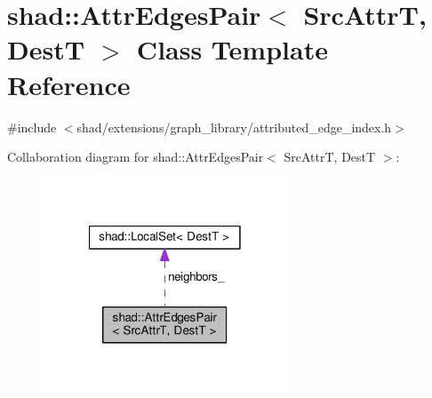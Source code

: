 \hypertarget{classshad_1_1AttrEdgesPair}{\section{shad\-:\-:Attr\-Edges\-Pair$<$ Src\-Attr\-T, Dest\-T $>$ Class Template Reference}
\label{classshad_1_1AttrEdgesPair}
}


{\ttfamily \#include $<$shad/extensions/graph\-\_\-library/attributed\-\_\-edge\-\_\-index.\-h$>$}



Collaboration diagram for shad\-:\-:Attr\-Edges\-Pair$<$ Src\-Attr\-T, Dest\-T $>$\-:
\nopagebreak
\begin{figure}[H]
\begin{center}
\leavevmode
\includegraphics[width=206pt]{classshad_1_1AttrEdgesPair__coll__graph}
\end{center}
\end{figure}
